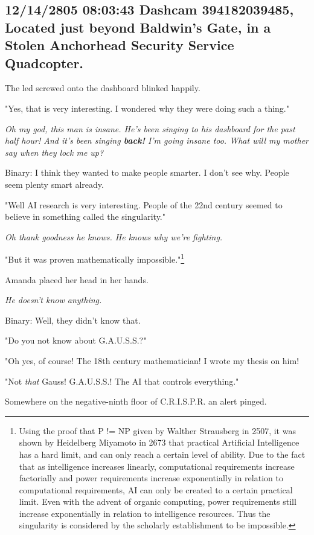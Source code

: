 \documentclass[12pt]{article}
\begin{document}
\subsection*{12/14/2805 08:03:43 Dashcam 394182039485, Located just beyond Baldwin's Gate, in a Stolen Anchorhead Security Service Quadcopter.}
\label{sec:org9bbc25d}

The led screwed onto the dashboard blinked happily.

"Yes, that is very interesting. I wondered why they were doing such a thing."

\emph{Oh my god, this man is insane. He's been singing to his dashboard for the past half hour! And it's been singing \textbf{back!} I'm going insane too. What will my mother say when they lock me up?}

Binary: I think they wanted to make people smarter. I don't see why. People seem plenty smart already.

"Well AI research is very interesting. People of the 22nd century seemed to believe in something called the singularity."

\emph{Oh thank goodness he knows. He knows why we're fighting.}

"But it was proven mathematically impossible."\footnote{Using the proof that P != NP given by Walther Strausberg in 2507, it was shown by Heidelberg Miyamoto in 2673 that practical Artificial Intelligence has a hard limit, and can only reach a certain level of ability. Due to the fact that as intelligence increases linearly, computational requirements increase factorially and power requirements increase exponentially in relation to computational requirements, AI can only be created to a certain practical limit. Even with the advent of organic computing, power requirements still increase exponentially in relation to intelligence resources. Thus the singularity is considered by the scholarly establishment to be impossible.\label{org100c7c2}}

Amanda placed her head in her hands.

\emph{He doesn't know anything.}

Binary: Well, they didn't know that.

"Do you not know about G.A.U.S.S.?"

"Oh yes, of course! The 18th century mathematician! I wrote my thesis on him!

"Not \emph{that} Gauss! G.A.U.S.S.! The AI that controls everything."

Somewhere on the negative-ninth floor of C.R.I.S.P.R. an alert pinged.
\end{document}
